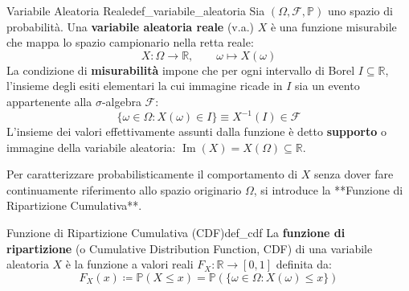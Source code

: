 \begin{definizione}{Variabile Aleatoria Reale}{def_variabile_aleatoria}
Sia $(\Omega, \mathcal{F}, \mathbb{P})$ uno spazio di probabilità. Una \textbf{variabile aleatoria reale} (v.a.) $X$ è una funzione misurabile che mappa lo spazio campionario nella retta reale:
\begin{equation}
    X: \Omega \longrightarrow \mathbb{R}, \qquad \omega \longmapsto X(\omega)
\end{equation}
La condizione di \textbf{misurabilità} impone che per ogni intervallo di Borel $I \subseteq \mathbb{R}$, l'insieme degli esiti elementari la cui immagine ricade in $I$ sia un evento appartenente alla $\sigma$-algebra $\mathcal{F}$:
\begin{equation}
    \{\omega \in \Omega : X(\omega) \in I\} \equiv X^{-1}(I) \in \mathcal{F}
\end{equation}
L'insieme dei valori effettivamente assunti dalla funzione è detto \textbf{supporto} o immagine della variabile aleatoria: $\operatorname{Im}(X) = X(\Omega) \subseteq \mathbb{R}$.
\end{definizione}

Per caratterizzare probabilisticamente il comportamento di $X$ senza dover fare continuamente riferimento allo spazio originario $\Omega$, si introduce la **Funzione di Ripartizione Cumulativa**.

\begin{definizione}{Funzione di Ripartizione Cumulativa (CDF)}{def_cdf}
La \textbf{funzione di ripartizione} (o Cumulative Distribution Function, CDF) di una variabile aleatoria $X$ è la funzione a valori reali $F_X: \mathbb{R} \to [0, 1]$ definita da:
\begin{equation}
    F_X(x) \coloneqq \mathbb{P}(X \le x) = \mathbb{P}(\{\omega \in \Omega : X(\omega) \le x\})
\end{equation}
\end{definizione}

